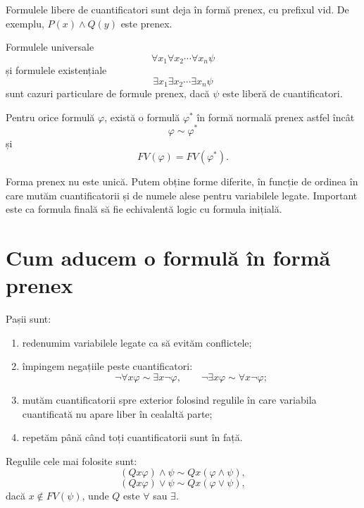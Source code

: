 \begin{note}
	Formulele libere de cuantificatori sunt deja în formă prenex, cu prefixul vid. De exemplu, \(P(x)\land Q(y)\) este prenex.
\end{note}

\begin{eg}
	Formulele universale
	\[
		\forall x_1 \forall x_2 \cdots \forall x_n \psi
	\]
	și formulele existențiale
	\[
		\exists x_1 \exists x_2 \cdots \exists x_n \psi
	\]
	sunt cazuri particulare de formule prenex, dacă \( \psi \) este liberă de cuantificatori.
\end{eg}

\begin{theorem}
	Pentru orice formulă \( \varphi \), există o formulă \( \varphi^* \) în formă normală prenex astfel încât
	\[
		\varphi \sim \varphi^*
	\]
	și
	\[
		FV(\varphi)=FV(\varphi^*).
	\]
\end{theorem}

\begin{note}
	Forma prenex nu este unică. Putem obține forme diferite, în funcție de ordinea în care mutăm cuantificatorii și de numele alese pentru variabilele legate. Important este ca formula finală să fie echivalentă logic cu formula inițială.
\end{note}

\section{Cum aducem o formulă în formă prenex}

\begin{note}
	Pașii sunt:
	\begin{enumerate}
		\item redenumim variabilele legate ca să evităm conflictele;
		\item împingem negațiile peste cuantificatori:
		      \[
			      \neg \forall x\varphi \sim \exists x\neg\varphi,
			      \qquad
			      \neg \exists x\varphi \sim \forall x\neg\varphi;
		      \]
		\item mutăm cuantificatorii spre exterior folosind regulile în care variabila cuantificată nu apare liber în cealaltă parte;
		\item repetăm până când toți cuantificatorii sunt în față.
	\end{enumerate}
\end{note}

Regulile cele mai folosite sunt:
\[
	(Qx\varphi) \land \psi \sim Qx(\varphi \land \psi),
\]
\[
	(Qx\varphi) \lor \psi \sim Qx(\varphi \lor \psi),
\]
dacă \(x \notin FV(\psi)\), unde \(Q\) este \( \forall \) sau \( \exists \).

